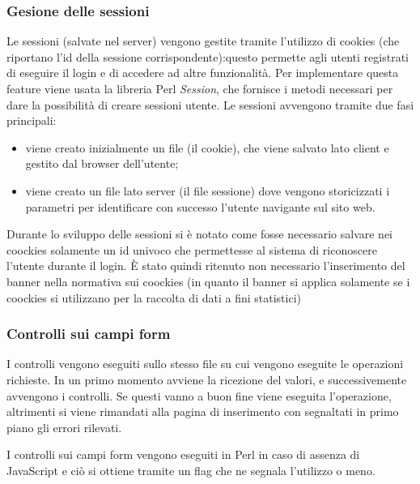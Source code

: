 \subsubsection{Gesione delle sessioni}
Le sessioni (salvate nel server) vengono gestite tramite l'utilizzo di cookies (che riportano l'id della sessione corrispondente):questo permette agli utenti registrati di eseguire il login e di accedere ad altre funzionalit\`a.
Per implementare questa feature viene usata la libreria Perl \textit{Session}, che fornisce i metodi necessari per dare la possibilit\`a di creare sessioni utente. Le sessioni avvengono tramite due fasi principali:
\begin{itemize}

    \item viene creato inizialmente un file (il cookie), che viene salvato lato client e gestito dal browser dell'utente;
    \item viene creato un file lato server (il file sessione) dove vengono storicizzati i parametri per identificare con successo l'utente navigante sul sito web.

\end{itemize}

Durante lo sviluppo delle sessioni si \`e notato come fosse necessario salvare nei coockies solamente un id univoco che permettesse al sistema di riconoscere l'utente durante il login. \`E stato quindi ritenuto non necessario l'inserimento del banner nella normativa sui coockies (in quanto il banner si applica solamente se i coockies si utilizzano per la raccolta di dati a fini statistici)

\subsubsection{Controlli sui campi form}
I controlli vengono eseguiti sullo stesso file su cui vengono eseguite le operazioni richieste. In un primo momento avviene la ricezione del valori, e successivemente avvengono i controlli. Se questi vanno a buon fine viene eseguita l'operazione, altrimenti si viene rimandati alla pagina di inserimento con segnaltati in primo piano gli errori rilevati.

I controlli sui campi form vengono eseguiti in Perl in caso di assenza di JavaScript e ci\`o si ottiene tramite un flag che ne segnala l'utilizzo o meno.

